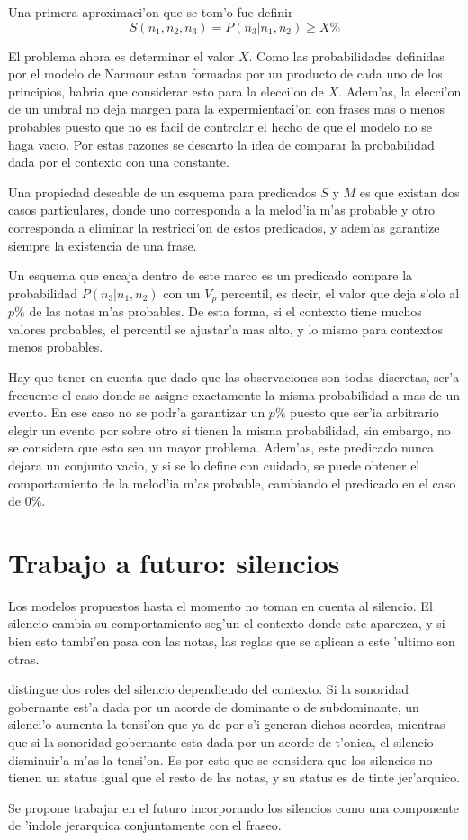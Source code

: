 Una primera aproximaci'on que se tom'o fue definir 
$$S(n_1, n_2, n_3) = P(n_3 | n_1, n_2) \geq X\%$$

El problema ahora es determinar
el valor $X$. Como las probabilidades definidas por el modelo de Narmour estan formadas por un producto de cada uno de los principios, habria 
que considerar esto para la elecci'on de $X$. Adem'as, la elecci'on de un umbral no deja margen para la expermientaci'on con frases
mas o menos probables puesto que no es facil de controlar el hecho de que el modelo no se haga vacio. 
Por estas razones se descarto la idea de comparar la probabilidad dada por el contexto con una constante. 

Una propiedad deseable de un esquema para predicados $S$ y $M$ es que existan dos casos particulares, 
donde uno corresponda a la melod'ia m'as probable
y otro corresponda a eliminar la restricci'on de estos predicados, y adem'as garantize siempre la existencia de una frase. 

Un esquema que encaja dentro de este marco es un predicado compare la probabilidad $P(n_3 | n_1, n_2)$ con un 
$V_p$ percentil, es decir, el valor que deja s'olo al $p\%$ de las notas m'as probables.  De esta forma, si el contexto tiene muchos valores probables, 
el percentil se ajustar'a mas alto, y lo mismo para contextos menos probables.

Hay que tener en cuenta que dado que las observaciones son todas discretas, ser'a frecuente el caso donde 
se asigne exactamente la misma probabilidad a mas de un evento. En ese caso no se podr'a garantizar un $p\%$ puesto que ser'ia arbitrario
elegir un evento por sobre otro si tienen la misma probabilidad, sin embargo, no se considera que esto sea un mayor problema. Adem'as, este predicado nunca dejara un conjunto vacio, y si se lo define con cuidado, se puede obtener
el comportamiento de la melod'ia m'as probable, cambiando el predicado en el caso de $0\%$.


\section{Trabajo a futuro: silencios}
Los modelos propuestos hasta el momento no toman en cuenta al silencio. 
El silencio cambia su comportamiento seg'un el contexto donde este aparezca, y si bien esto tambi'en pasa con las notas, las reglas que se
aplican a este 'ultimo son otras. 

\cite{Margulis08} distingue dos roles del silencio dependiendo del contexto. Si la sonoridad gobernante est'a dada por un acorde de dominante
o de subdominante, un silenci'o aumenta la tensi'on que ya de por s'i generan dichos acordes, mientras que si la sonoridad gobernante
esta dada por un acorde de t'onica, el silencio disminuir'a m'as la tensi'on. Es por esto que se considera que los silencios no tienen 
un status igual que el resto de las notas, y su status es de tinte jer'arquico.

Se propone trabajar en el futuro incorporando los silencios como una componente de 'indole jerarquica conjuntamente con el fraseo.
